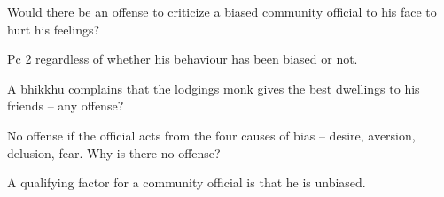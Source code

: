 \bigskip

Would there be an offense to criticize a biased community official to his face to hurt his feelings?

\begin{solution}
  Pc 2 regardless of whether his behaviour has been biased or not.
\end{solution}

\bigskip

A bhikkhu complains that the lodgings monk gives the best dwellings to his friends – any offense?

\begin{solution}
  No offense if the official acts from the four causes of bias – desire, aversion,
  delusion, fear. Why is there no offense?

  A qualifying factor for a community official is that he is unbiased.
\end{solution}
